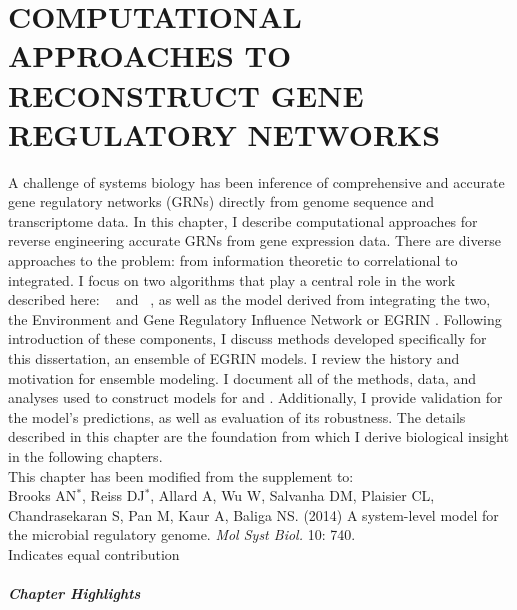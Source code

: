  
\chapter {\uppercase{Computational approaches to reconstruct gene regulatory networks}}
\label{chap:2}

 A challenge of systems biology has been inference of comprehensive and accurate gene regulatory networks (GRNs) directly from genome sequence and transcriptome data. In this chapter, I describe computational approaches for reverse engineering accurate GRNs from gene expression data. There are diverse approaches to the problem: from information theoretic to correlational to integrated. I focus on two algorithms that play a central role in the work described here: \cm\ \cite{reiss_integrated_2006} and \nwinf\ \cite{bonneau_inferelator:_2006}, as well as the model derived from integrating the two, the Environment and Gene Regulatory Influence Network or EGRIN \cite{bonneau_predictive_2007}. Following introduction of these components, I discuss methods developed specifically for this dissertation, an ensemble of EGRIN models. I review the history and motivation for ensemble modeling. I document all of the methods, data, and analyses used to construct models for \halo and \eco. Additionally, I provide validation for the model's predictions, as well as evaluation of its robustness. The details described in this chapter are the foundation from which I derive biological insight in the following chapters.\\

 \noindent This chapter has been modified from the supplement to: \\

 \noindent Brooks AN$^{*}$, Reiss DJ$^{*}$, Allard A, Wu W, Salvanha DM, Plaisier CL, Chandrasekaran S, Pan M, Kaur A, Baliga NS. (2014) A system-level model for the microbial regulatory genome. \emph{Mol Syst Biol.}  10: 740.\\

 \noindent * Indicates equal contribution 

 \paragraph{Chapter Highlights}

